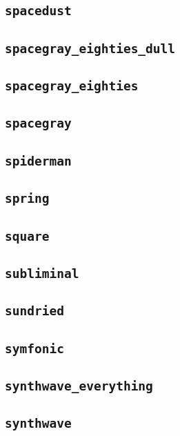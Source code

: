 \subsection{\texttt{spacedust}}
\newpage
\subsection{\texttt{spacegray\_eighties\_dull}}
\newpage
\subsection{\texttt{spacegray\_eighties}}
\newpage
\subsection{\texttt{spacegray}}
\newpage
\subsection{\texttt{spiderman}}
\newpage
\subsection{\texttt{spring}}
\newpage
\subsection{\texttt{square}}
\newpage
\subsection{\texttt{subliminal}}
\newpage
\subsection{\texttt{sundried}}
\newpage
\subsection{\texttt{symfonic}}
\newpage
\subsection{\texttt{synthwave\_everything}}
\newpage
\subsection{\texttt{synthwave}}
\newpage
